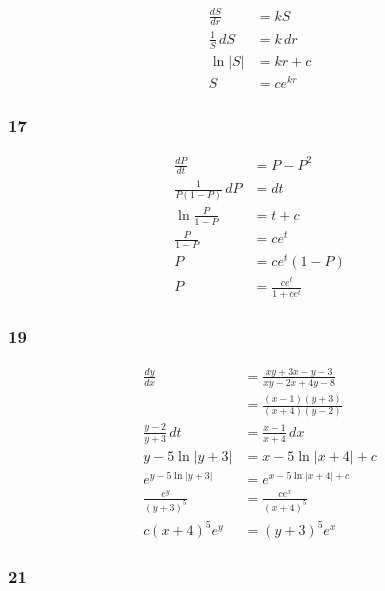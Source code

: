 \documentclass{article}
\begin{document}
\begin{align*}
  \frac{d S}{d r}   & = k S       \\
  \frac{1}{S} \,d S & = k \,d r   \\
  \ln |S|           & = k r + c   \\
  S                 & = c e^{k r}
\end{align*}

\subsubsection{17}

\begin{align*}
  \frac{d P}{d t}           & = P - P^2                 \\
  \frac{1}{P (1 - P)} \,d P & = d t                     \\
  \ln \frac{P}{1 - P}       & = t + c                   \\
  \frac{P}{1 - P}           & = c e^t                   \\
  P                         & = c e^t (1 - P)           \\
  P                         & = \frac{c e^t}{1 + c e^t}
\end{align*}

\subsubsection{19}

\begin{align*}
  \frac{d y}{d x}           & = \frac{x y + 3 x - y - 3}{x y - 2 x + 4 y - 8} \\
                            & = \frac{(x - 1) (y + 3)}{(x + 4) (y - 2)}       \\
  \frac{y - 2}{y + 3} \,d t & = \frac{x - 1}{x + 4} \,d x                     \\
  y - 5 \ln |y + 3|         & = x - 5 \ln |x + 4| + c                         \\
  e^{y - 5 \ln |y + 3|}     & = e^{x - 5 \ln |x + 4| + c}                     \\
  \frac{e^y}{(y + 3)^5}     & = \frac{c e^x}{(x + 4)^5}                       \\
  c (x + 4)^5 e^y           & = (y + 3)^5 e^x
\end{align*}

\subsubsection{21}
\end{document}
